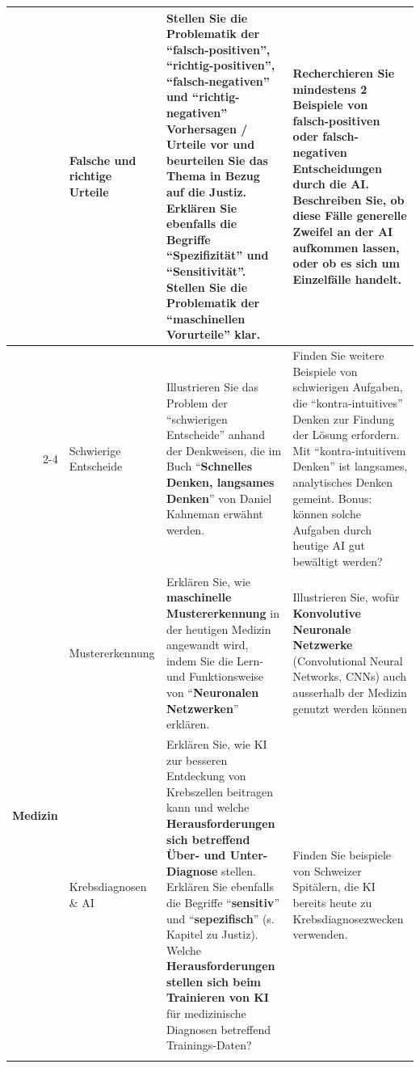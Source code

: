\begin{landscape}
\begin{longtable}{@{}r|p{5.3cm}||p{10cm}|p{10cm}@{}}
		                              & Falsche und richtige Urteile          & Stellen Sie die Problematik der ``\textbf{falsch-positiven}'', ``\textbf{richtig-positiven}'', ``\textbf{falsch-negativen}'' und ``\textbf{richtig-negativen}'' Vorhersagen / Urteile vor und beurteilen Sie das Thema in Bezug auf die Justiz. Erklären Sie ebenfalls die Begriffe ``\textbf{Spezifizität}'' und ``\textbf{Sensitivität}''. Stellen Sie die Problematik der ``\textbf{maschinellen Vorurteile}'' klar.                    & Recherchieren Sie mindestens 2 Beispiele von falsch-positiven oder falsch-negativen Entscheidungen durch die AI. Beschreiben Sie, ob diese Fälle generelle Zweifel an der AI aufkommen lassen, oder ob es sich um Einzelfälle handelt.                                           \\\cmidrule(l){2-4}
		                              & Schwierige Entscheide                 & Illustrieren Sie das Problem der ``schwierigen Entscheide'' anhand der Denkweisen, die im Buch ``\textbf{Schnelles Denken, langsames Denken}'' von Daniel Kahneman erwähnt werden.                                                                                                                        & Finden Sie weitere Beispiele von schwierigen Aufgaben, die ``kontra-intuitives'' Denken zur Findung der Lösung erfordern. Mit ``kontra-intuitivem Denken'' ist langsames, analytisches Denken gemeint. Bonus: können solche Aufgaben durch heutige AI gut bewältigt werden?      \\\midrule\midrule
		\multirow{3}{*}{\textbf{Medizin}}      & Mustererkennung                       & Erklären Sie, wie \textbf{maschinelle Mustererkennung} in der heutigen Medizin angewandt wird, indem Sie die Lern- und Funktionsweise von ``\textbf{Neuronalen Netzwerken}'' erklären.                                                                                                                                                                                                         & Illustrieren Sie, wofür \textbf{Konvolutive Neuronale Netzwerke} (Convolutional Neural Networks, CNNs) auch ausserhalb der Medizin genutzt werden können                                                                                                                                  \\\cmidrule(l){2-4}
		                              & Krebsdiagnosen \& AI                  & Erklären Sie, wie KI zur besseren Entdeckung von Krebszellen beitragen kann und welche \textbf{Herausforderungen sich betreffend Über- und Unter-Diagnose} stellen. Erklären Sie ebenfalls die Begriffe ``\textbf{sensitiv}'' und ``\textbf{sepezifisch}'' (s. Kapitel zu Justiz). Welche \textbf{Herausforderungen stellen sich beim Trainieren von KI} für medizinische Diagnosen betreffend Trainings-Daten? & Finden Sie beispiele von Schweizer Spitälern, die KI bereits heute zu Krebsdiagnosezwecken verwenden.                                                                                                                                                                            \\\cmidrule(l){2-4}

\end{longtable}
\end{landscape}
